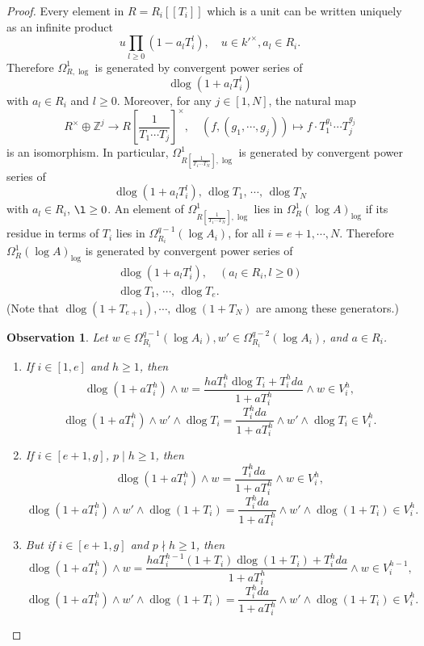 \documentclass[11pt]{amsart}
\newcommand{\ra}{\rightarrow}
\newcommand{\Z}{\mathbb{Z}}
\newcommand{\dlog}{\operatorname{dlog}}
\theoremstyle{plain}
\newtheorem{Observation}{Observation}[prop]
\theoremstyle{definition}
\numberwithin{equation}{prop}
\begin{document}
\begin{proof}
Every element in $R=R_i[[T_i]]$ which is a unit can be written uniquely as an infinite product
$$u\prod_{l\ge 0}(1-a_lT_i^l),\quad u\in k'^\times, a_l\in R_i.$$
Therefore $\Omega^1_{R,\log}$ is generated by convergent power series of
$$\dlog (1+a_{l}T_i^l)$$
with $a_{l}\in R_i$ and $l\ge 0$.
Moreover, for any $j\in [1,N]$, the natural map
$$R^\times \oplus \Z^j\ra R[\frac{1}{T_1\cdots T_j}]^\times, \quad
(f,(g_1,\cdots ,g_j))\mapsto f\cdot T_1^{g_1}\cdots T_j^{g_j}
$$
is an isomorphism.
In particular, $\Omega^1_{R[\frac{1}{T_1\cdots T_N}],\log}$ is generated by convergent power series of
$$\dlog (1+a_{l}T_i^l), \,
\dlog T_1,\,\cdots,\,\dlog T_N$$
with $a_{l}\in R_i$, $\l\ge 0$.
An element of $\Omega^1_{R[\frac{1}{T_1\cdots T_N}],\log}$ lies in
$\Omega^1_R(\log A)_{\log}$ if  its residue in terms of $T_{i}$  lies in $\Omega^{q-1}_{R_i}(\log A_i)$, for all $i=e+1,\cdots, N$.
Therefore 
$\Omega^1_R(\log A)_{\log}$ 
is generated by convergent power series of
\begin{align}
\label{lem3:eq0}
\dlog(1+a_lT_i^l),
\quad (a_l\in R_i, l\ge 0)
\\
\dlog T_1,\,\cdots,\,\dlog T_e.
\end{align}
(Note that $\dlog (1+T_{e+1}),\cdots, \dlog (1+T_N)$ are among these generators.)
\begin{Observation}
\label{obs1}
Let $w\in \Omega^{q-1}_{R_i}(\log A_i), w'\in \Omega^{q-2}_{R_i}(\log A_i)$, and $a\in R_i$. 
\begin{enumerate}
    \item 

If $i\in [1,e]$ and $h\ge 1$, then 
$$\dlog(1+aT_i^{h})\wedge w =\frac{haT_i^{h}\dlog T_i
+T_i^{h}da
}{1+aT_i^{h}}\wedge w
\in V_i^{h},
$$
$$
\dlog(1+aT_i^{h})\wedge w'\wedge\dlog T_i
=\frac{T_i^{h}da
}{1+aT_i^{h}}\wedge w' \wedge\dlog T_i
\in V_i^{h}.$$
\item 
If $i\in[e+1,g]$, $p\mid h\ge 1$, then
$$\dlog(1+aT_i^{h})\wedge w
=\frac{T_i^{h}da
}{1+aT_i^{h}}\wedge w
\in V_i^{h},$$
$$
\dlog(1+aT_i^{h})\wedge w'\wedge\dlog (1+T_i)
=\frac{T_i^{h}da
}{1+aT_i^{h}}\wedge w' \wedge\dlog (1+T_i)
\in V_i^{h}
.$$
\item 
But if $i\in[e+1,g]$ and $p\nmid h\ge 1$, then
$$\dlog(1+aT_i^{h})\wedge w=
\frac{haT_i^{h-1}(1+T_i)\dlog (1+T_i)+T_i^{h}da
}{1+aT_i^{h}}\wedge w
\in V_i^{h-1},$$
$$
\dlog(1+aT_i^{h})\wedge w'\wedge\dlog (1+T_i)
=\frac{T_i^{h}da
}{1+aT_i^{h}}\wedge w' \wedge\dlog (1+T_i)
\in V_i^{h}
.$$
\end{enumerate}
\end{Observation}




\end{proof}
\end{document}
